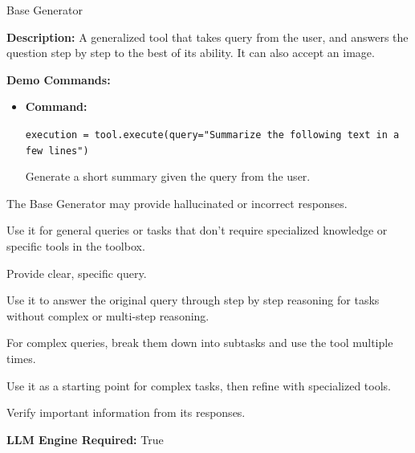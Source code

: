 \begin{tooldescbox}{{Base Generator}}
\setlength{\parindent}{0pt}
\setlength{\parskip}{4pt}

\textbf{Description:} A generalized tool that takes query from the user, and answers the question step by step to the best of its ability. It can also accept an image.

\vspace{6pt}


\vspace{4pt}


\vspace{6pt}

\textbf{Demo Commands:}
\begin{itemize}[left=0pt, label={}, itemsep=0pt, parsep=0pt]
\item \textbf{Command:}
\begin{simplecode}
\texttt{execution = tool.execute(query="Summarize the following text in a few lines")}
\end{simplecode}

  Generate a short summary given the query from the user.
\end{itemize}
\begin{limitationbox}
The Base Generator may provide hallucinated or incorrect responses.
\end{limitationbox}

\begin{bestpracticebox}
\begin{toolenum}
    \item Use it for general queries or tasks that don't require specialized knowledge or specific tools in the toolbox.
    \item Provide clear, specific query.
    \item Use it to answer the original query through step by step reasoning for tasks without complex or multi-step reasoning.
    \item For complex queries, break them down into subtasks and use the tool multiple times.
    \item Use it as a starting point for complex tasks, then refine with specialized tools.
    \item Verify important information from its responses.
\end{toolenum}
\end{bestpracticebox}

\textbf{LLM Engine Required:} True
\end{tooldescbox}